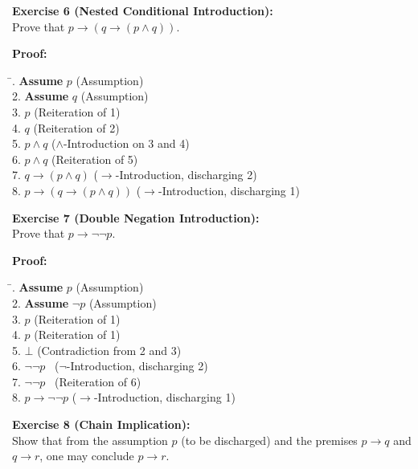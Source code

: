 \documentclass[12pt]{article}
\begin{document}
\bigskip
\textbf{Exercise 6 (Nested Conditional Introduction):}\\[0.3em]
Prove that \(p\to (q\to (p\land q))\).

\textbf{Proof:}
\begin{tabbing}
\hspace*{2cm}\= . \quad \textbf{Assume } \(p\) \quad \quad (Assumption)\\[0.5em]
2. \quad \textbf{Assume } \(q\) \quad \quad (Assumption)\\[0.5em]
3. \quad \(p\) \quad \quad \quad (Reiteration of 1)\\[0.5em]
4. \quad \(q\) \quad \quad \quad (Reiteration of 2)\\[0.5em]
5. \quad \(p\land q\) \quad \quad (\(\land\)-Introduction on 3 and 4)\\[0.5em]
6. \quad \(p\land q\) \quad \quad (Reiteration of 5)\\[0.5em]
7. \quad \(q\to (p\land q)\) \quad (\(\to\)-Introduction, discharging 2)\\[0.5em]
8. \quad \(p\to (q\to (p\land q))\) \quad (\(\to\)-Introduction, discharging 1)
\end{tabbing}

\bigskip
\textbf{Exercise 7 (Double Negation Introduction):}\\[0.3em]
Prove that \(p\to \lnot\lnot p\).

\textbf{Proof:}
\begin{tabbing}
\hspace*{2cm}\= . \quad \textbf{Assume } \(p\) \quad \quad (Assumption)\\[0.5em]
2. \quad \textbf{Assume } \(\lnot p\) \quad \quad (Assumption)\\[0.5em]
3. \quad \(p\) \quad \quad \quad (Reiteration of 1)\\[0.5em]
4. \quad \(p\) \quad \quad \quad (Reiteration of 1)\\[0.5em]
5. \quad \(\bot\) \quad \quad (Contradiction from 2 and 3)\\[0.5em]
6. \quad \(\lnot\lnot p\) \quad \ (\(\lnot\)-Introduction, discharging 2)\\[0.5em]
7. \quad \(\lnot\lnot p\) \quad \ (Reiteration of 6)\\[0.5em]
8. \quad \(p\to \lnot\lnot p\) \quad (\(\to\)-Introduction, discharging 1)
\end{tabbing}

\bigskip
\textbf{Exercise 8 (Chain Implication):}\\[0.3em]
Show that from the assumption \(p\) (to be discharged) and the premises \(p\to q\) and \(q\to r\), one may conclude \(p\to r\).
\end{document}
